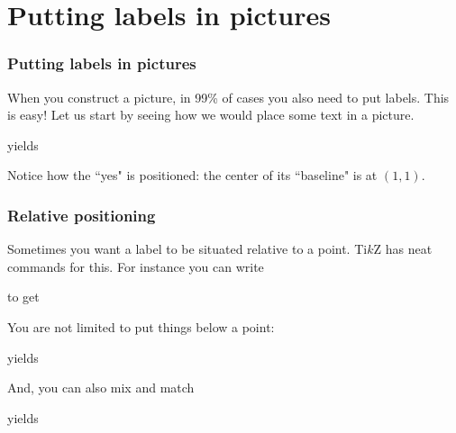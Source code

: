 %
%
\section{
  Putting labels in pictures
}

\begin{frame}[fragile]
  \frametitle{
    Putting labels in pictures
}

  When you construct a picture, in 99\% of cases you also need to put labels. This is easy! Let us start by seeing how we would place some text in a picture.

  
  
  yields

  \begin{center}
    
  \end{center}

 Notice how the ``yes" is positioned: the center of its ``baseline" is at $(1,1).$

\end{frame}

%
%
\begin{frame}[fragile]
  \frametitle{
    Relative positioning
  }

  Sometimes you want a label to be situated relative to a point. Ti$k$Z has neat
  commands for this. For instance you can write

  
  
  to get

  \begin{center}
    
    \end{center}

\end{frame}

%
%
\begin{frame}[fragile]

  You are not limited to put things below a point:

  
  
  yields
  
  \begin{center}
    
  \end{center}

\end{frame}
%
%
\begin{frame}[fragile]
  
  And, you can also mix and match

  
  
  yields

  \begin{center}
    
  \end{center}

\end{frame}

